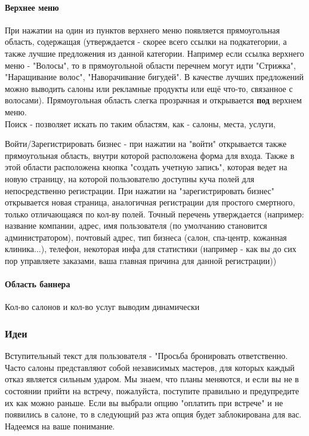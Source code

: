\documentclass[DIV=calc, paper=a4, fontsize=11pt]{scrartcl} %
\begin{document}
\paragraph{Верхнее меню}
При нажатии на один из пунктов верхнего меню появляется прямоугольная область, содержащая (утверждается - скорее всего ссылки на подкатегории, а также лучшие предложения из данной категории. Например если ссылка верхнего меню - "Волосы", то в прямоугольной области перечнем могут идти "Стрижка", "Наращивание волос", "Наворачивание бигудей". В качестве лучших предложений можно выводить салоны или рекламные продукты или ещё что-то, связанное с волосами). Прямоугольная область слегка прозрачная и открывается \textbf{под} верхнем меню. 
\\[0.5cm]
Поиск - позволяет искать по таким областям, как - салоны, места, услуги, 

Войти/Зарегистрировать бизнес - при нажатии на "войти" открывается также прямоугольная область, внутри которой расположена форма для входа. Также в этой области расположена кнопка "создать учетную запись", которая ведет на новую страницу, на которой пользователю доступны куча полей для непосредственно регистрации.
При нажатии на "зарегистрировать бизнес" открывается новая страница, аналогичная регистрации для простого смертного, только отличающаяся по кол-ву полей. Точный перечень утверждается (например: название компании, адрес, имя пользователя (по умолчанию становится администратором), почтовый адрес, тип бизнеса (салон, спа-центр, кожанная клиника...), телефон, некоторая инфа для статистики (например - как вы до сих пор управляете заказами, ваша главная причина для данной регистрации))

\paragraph{Область баннера}
Кол-во салонов и кол-во услуг выводим динамически

\subsubsection{Идеи}

Вступительный текст для пользователя - "Просьба бронировать ответственно. Часто салоны представляют собой независимых мастеров, для которых каждый отказ является сильным ударом. Мы знаем, что планы меняются, и если вы не в состоянии прийти на встречу, пожалуйста, поступите правильно и предупредите их как можно раньше. Если вы выбрали опцию "оплатить при встрече" и не появились в салоне, то в следующий раз жта опция будет заблокирована для вас. Надеемся на ваше понимание.
\end{document}

